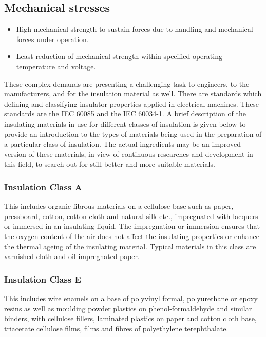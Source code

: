 \subsection*{Mechanical stresses}
\begin{itemize}
	\item High mechanical strength to sustain forces due to handling and mechanical forces under operation.
	\item Least reduction of mechanical strength within specified operating temperature and voltage.
\end{itemize}

These complex demands are presenting a challenging task to engineers, to the manufacturers, and for the insulation material as well. There are standards which defining and classifying insulator properties applied in electrical machines. These standards are the IEC 60085 and the IEC 60034-1.
A brief description of the insulating materials in use for different classes of insulation is given below to provide an introduction to the types of materials being used in the preparation of a particular class of insulation. The actual ingredients may be an improved version of these materials, in view of continuous researches and development in this field, to search out for still  better and more suitable materials.

\subsubsection*{Insulation Class A}
This includes organic fibrous materials on a cellulose base such as paper, pressboard, cotton, cotton cloth and natural silk etc., impregnated with lacquers or immersed in an insulating liquid. The impregnation or immersion ensures that the oxygen content of the air does not affect the insulating properties or enhance the thermal ageing of the insulating material. Typical materials in this class are varnished cloth and oil-impregnated paper.

\subsubsection*{Insulation Class E}
This includes wire enamels on a base of polyvinyl formal, polyurethane or epoxy resins as well as moulding powder plastics on phenol-formaldehyde and similar binders, with cellulose fillers, laminated plastics on paper and cotton cloth base, triacetate cellulose films, films and fibres of polyethylene terephthalate.

